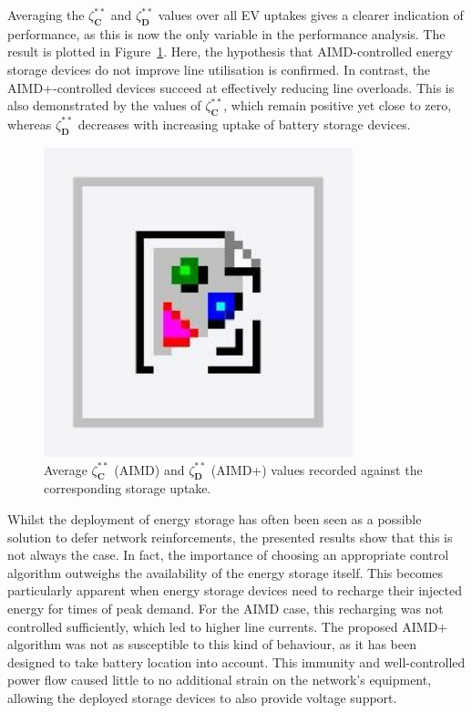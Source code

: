 Averaging the $\zeta_\textbf{C}^{**}$ and $\zeta_\textbf{D}^{**}$ values over all EV uptakes gives a clearer indication of performance, as this is now the only variable in the performance analysis. The result is plotted in Figure~\ref{fig-utilisation-AIMD-compare}. Here, the hypothesis that AIMD-controlled energy storage devices do not improve line utilisation is confirmed. In contrast, the AIMD+-controlled devices succeed at effectively reducing line overloads. This is also demonstrated by the values of $\zeta_\textbf{C}^{**}$, which remain positive yet close to zero, whereas $\zeta_\textbf{D}^{**}$ decreases with increasing uptake of battery storage devices.

\begin{figure}\centering
 \includegraphics[width=0.8\textwidth]{foo}
 \caption{Average $\zeta_\textbf{C}^{**}$ (AIMD) and $\zeta_\textbf{D}^{**}$ (AIMD+) values recorded against the corresponding storage uptake.}
 \label{fig-utilisation-AIMD-compare}
\end{figure}

Whilst the deployment of energy storage has often been seen as a possible solution to defer network reinforcements, the presented results show that this is not always the case. In fact, the importance of choosing an appropriate control algorithm outweighs the availability of the energy storage itself. This becomes particularly apparent when energy storage devices need to recharge their injected energy for times of peak demand. For the AIMD case, this recharging was not controlled sufficiently, which led to higher line currents. The proposed AIMD+ algorithm was not as susceptible to this kind of behaviour, as it has been designed to take battery location into account. This immunity and well-controlled power flow caused little to no additional strain on the network's equipment, allowing the deployed storage devices to also provide voltage support.



